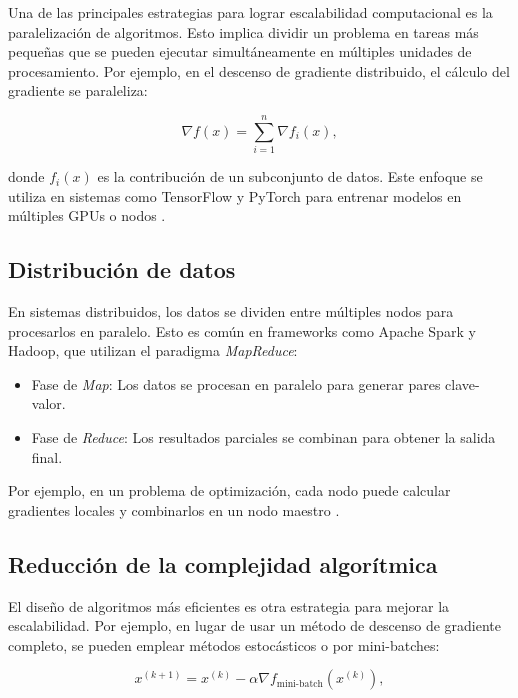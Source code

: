 \begin{itemize}
		Una de las principales estrategias para lograr escalabilidad computacional es la paralelización de algoritmos. Esto implica dividir un problema en tareas más pequeñas que se pueden ejecutar simultáneamente en múltiples unidades de procesamiento. Por ejemplo, en el descenso de gradiente distribuido, el cálculo del gradiente se paraleliza:
		
		\begin{equation}
			\nabla f(x) = \sum_{i=1}^n \nabla f_i(x),
		\end{equation}
		
		donde \(f_i(x)\) es la contribución de un subconjunto de datos. Este enfoque se utiliza en sistemas como TensorFlow y PyTorch para entrenar modelos en múltiples GPUs o nodos \cite{abadi2016tensorflow}.
		
		\subsection{Distribución de datos}
		
		En sistemas distribuidos, los datos se dividen entre múltiples nodos para procesarlos en paralelo. Esto es común en frameworks como Apache Spark y Hadoop, que utilizan el paradigma \textit{MapReduce}:
		
		\begin{itemize}
			\item Fase de \textit{Map}: Los datos se procesan en paralelo para generar pares clave-valor.
			\item Fase de \textit{Reduce}: Los resultados parciales se combinan para obtener la salida final.
		\end{itemize}
		
		Por ejemplo, en un problema de optimización, cada nodo puede calcular gradientes locales y combinarlos en un nodo maestro \cite{zaharia2010spark}.
		
		\subsection{Reducción de la complejidad algorítmica}
		
		El diseño de algoritmos más eficientes es otra estrategia para mejorar la escalabilidad. Por ejemplo, en lugar de usar un método de descenso de gradiente completo, se pueden emplear métodos estocásticos o por mini-batches:
		
		\begin{equation}
			x^{(k+1)} = x^{(k)} - \alpha \nabla f_{\text{mini-batch}}(x^{(k)}),
		\end{equation}
		

\end{itemize}
